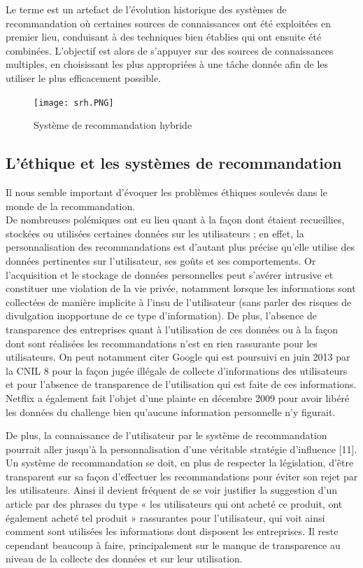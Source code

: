 \noindent

	Le terme  est un artefact de l’évolution historique des systèmes de recommandation où certaines sources de connaissances ont été exploitées en premier lieu, conduisant à des techniques bien établies qui ont ensuite été combinées. L’objectif est alors de s’appuyer sur des sources de connaissances multiples, en choisissant les plus appropriées à une tâche donnée afin de les utiliser le plus efficacement possible. \\
		
	\begin{figure}[!ht]
		\centering
		\texttt{[image: srh.PNG]}  
		\caption{Système de recommandation hybride}
		\label{Système de recommandation hybride}
	\end{figure}


\subsection{L’éthique et les systèmes de recommandation}
	Il nous semble important d’évoquer les problèmes éthiques soulevés dans le monde de la recommandation.\\ De nombreuses polémiques ont eu lieu quant à la façon dont étaient recueillies, stockées ou utilisées certaines données sur les utilisateurs ; en effet, la personnalisation des recommandations est d’autant plus précise qu’elle utilise des données pertinentes sur l’utilisateur, ses goûts et ses comportements. Or l’acquisition et le stockage de données personnelles peut s’avérer intrusive et constituer une violation de la vie privée, notamment lorsque les informations sont collectées de manière implicite à l’insu de l’utilisateur (sans parler des risques de divulgation inopportune de ce type d’information). De plus, l'absence de transparence des entreprises quant à l’utilisation de ces données ou à la façon dont sont réalisées les recommandations n’est en rien rassurante pour les utilisateurs. On peut notamment citer Google qui est poursuivi en juin 2013 par la CNIL 8 pour la façon jugée illégale de collecte d’informations des utilisateurs et pour l’absence de transparence de l’utilisation qui est faite de ces informations. Netflix a également fait l’objet d’une plainte en décembre 2009 pour avoir libéré les données du challenge bien qu’aucune information personnelle n’y figurait. 
	
\noindent
	
	De plus, la connaissance de l’utilisateur par le système de recommandation pourrait aller jusqu’à la personnalisation d’une véritable stratégie d’influence [11]. Un système de recommandation se doit, en plus de respecter la législation, d’être transparent sur sa façon d’effectuer les recommandations pour éviter son rejet par les utilisateurs. Ainsi il devient fréquent de se voir justifier la suggestion d’un article par des phrases du type « les utilisateurs qui ont acheté ce produit, ont également acheté tel produit » rassurantes pour l’utilisateur, qui voit ainsi comment sont utilisées les informations dont disposent les entreprises. Il reste cependant beaucoup à faire, principalement sur le manque de transparence au niveau de la collecte des données et sur leur utilisation. 
 
